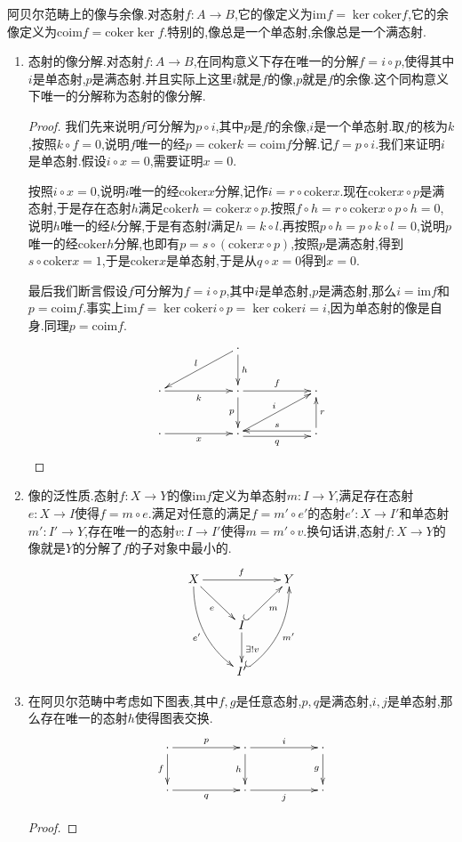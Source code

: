 阿贝尔范畴上的像与余像.对态射$f:A\to B$,它的像定义为$\mathrm{im}f=\ker\mathrm{coker}f$,它的余像定义为$\mathrm{coim}f=\mathrm{coker}\ker f$.特别的,像总是一个单态射,余像总是一个满态射.
\begin{enumerate}
	\item 态射的像分解.对态射$f:A\to B$,在同构意义下存在唯一的分解$f=i\circ p$,使得其中$i$是单态射,$p$是满态射.并且实际上这里$i$就是$f$的像,$p$就是$f$的余像.这个同构意义下唯一的分解称为态射的像分解.
	\begin{proof}
		
		我们先来说明$f$可分解为$p\circ i$,其中$p$是$f$的余像,$i$是一个单态射.取$f$的核为$k$,按照$k\circ f=0$,说明$f$唯一的经$p=\mathrm{coker}k=\mathrm{coim}f$分解.记$f=p\circ i$.我们来证明$i$是单态射.假设$i\circ x=0$,需要证明$x=0$.
		
		按照$i\circ x=0$,说明$i$唯一的经$\mathrm{coker}x$分解,记作$i=r\circ\mathrm{coker}x$.现在$\mathrm{coker}x\circ p$是满态射,于是存在态射$h$满足$\mathrm{coker}h=\mathrm{coker}x\circ p$.按照$f\circ h=r\circ\mathrm{coker}x\circ p\circ h=0$,说明$h$唯一的经$k$分解,于是有态射$l$满足$h=k\circ l$.再按照$p\circ h=p\circ k\circ l=0$,说明$p$唯一的经$\mathrm{coker}h$分解,也即有$p=s\circ(\mathrm{coker}x\circ p)$,按照$p$是满态射,得到$s\circ\mathrm{coker}x=1$,于是$\mathrm{coker}x$是单态射,于是从$q\circ x=0$得到$x=0$.
		
		最后我们断言假设$f$可分解为$f=i\circ p$,其中$i$是单态射,$p$是满态射,那么$i=\mathrm{im}f$和$p=\mathrm{coim}f$.事实上$\mathrm{im}f=\ker\mathrm{coker}i\circ p=\ker\mathrm{coker}i=i$,因为单态射的像是自身.同理$p=\mathrm{coim}f$.
		$$\xymatrix{&&\cdot\ar[d]^h\ar[dll]_l&&\\\cdot\ar[rr]_k&&\cdot\ar[rr]^f\ar[d]_p&&\cdot\\\cdot\ar[rr]_x&&\cdot\ar@<-0.5ex>[rr]_q\ar[urr]^i&&\cdot\ar@<-0.5ex>[ll]_s\ar[u]_r}$$
	\end{proof}
	\item 像的泛性质.态射$f:X\to Y$的像$\mathrm{im}f$定义为单态射$m:I\to Y$,满足存在态射$e:X\to I$使得$f=m\circ e$.满足对任意的满足$f=m'\circ e'$的态射$e':X\to I'$和单态射$m':I'\to Y$,存在唯一的态射$v:I\to I'$使得$m=m'\circ v$.换句话讲,态射$f:X\to Y$的像就是$Y$的分解了$f$的子对象中最小的.
	$$\xymatrix{X\ar[rr]^f\ar[dr]_e\ar@/_1pc/[ddr]_{e'}&&Y\\&I\ar@{^{(}->}[ur]_m\ar[d]^{\exists! v}&\\&I'\ar@{^{(}->}@/_1pc/[uur]_{m'}&}$$
	\item 在阿贝尔范畴中考虑如下图表,其中$f,g$是任意态射,$p,q$是满态射,$i,j$是单态射,那么存在唯一的态射$h$使得图表交换.
	$$\xymatrix{\cdot\ar[rr]^p\ar[d]_f&&\cdot\ar[rr]^i\ar[d]_h&&\cdot\ar[d]_g\\\cdot\ar[rr]_q&&\cdot\ar[rr]_j&&\cdot}$$
	\begin{proof}
		

\end{proof}
\end{enumerate}
